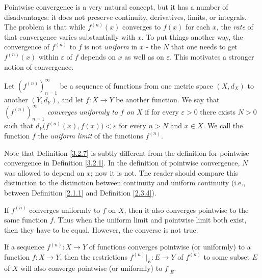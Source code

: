 \begin{note}
    Pointwise convergence is a very natural concept, but it has a number of disadvantages:
    it does not preserve continuity, derivatives, limits, or integrals.
    The problem is that while \(f^{(n)}(x)\) converges to \(f(x)\) for each \(x\), the \emph{rate} of that convergence varies substantially with \(x\).
    To put things another way, the convergence of \(f^{(n)}\) to \(f\) is not \emph{uniform} in \(x\)
    - the \(N\) that one needs to get \(f^{(n)}(x)\) within \(\varepsilon\) of \(f\) depends on \(x\) as well as on \(\varepsilon\).
    This motivates a stronger notion of convergence.
\end{note}

\setcounter{theorem}{6}
\begin{definition}\label{3.2.7}
    Let \((f^{(n)})_{n = 1}^\infty\) be a sequence of functions from one metric space \((X, d_X)\) to another \((Y, d_Y)\), and let \(f : X \to Y\) be another function.
    We say that \emph{\((f^{(n)})_{n = 1}^\infty\) converges uniformly to \(f\) on \(X\)} if for every \(\varepsilon > 0\) there exists \(N > 0\) such that \(d_Y\big(f^{(n)}(x), f(x)\big) < \varepsilon\) for every \(n > N\) and \(x \in X\).
    We call the function \(f\) the \emph{uniform limit} of the functions \(f^{(n)}\).
\end{definition}

\begin{remark}\label{3.2.8}
    Note that Definition \ref{3.2.7} is subtly different from the definition for pointwise convergence in Definition \ref{3.2.1}.
    In the definition of pointwise convergence, \(N\) was allowed to depend on \(x\);
    now it is not.
    The reader should compare this distinction to the distinction between continuity and uniform continuity
    (i.e., between Definition \ref{2.1.1} and Definition \ref{2.3.4}).
\end{remark}

\begin{note}
    If \(f^{(n)}\) converges uniformly to \(f\) on \(X\), then it also converges pointwise to the same function \(f\).
    Thus when the uniform limit and pointwise limit both exist, then they have to be equal.
    However, the converse is not true.
\end{note}

\begin{note}
    If a sequence \(f^{(n)} : X \to Y\) of functions converges pointwise (or uniformly) to a function \(f : X \to Y\), then the restrictions \(f^{(n)}|_E : E \to Y\) of \(f^{(n)}\) to some subset \(E\) of \(X\) will also converge pointwise (or uniformly) to \(f|_E\).
\end{note}

